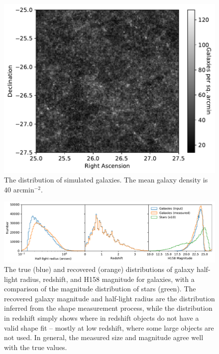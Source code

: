 \documentclass[aps,prd, amsmath,amssymb,superscriptaddress,showkeys,nofootinbib,reprint,preprintnumbers]{revtex4-1}
\begin{document}
\begin{figure}
\begin{center}
\includegraphics[width=\columnwidth]{figures/galaxies.pdf}
\end{center}
\caption[]{
The distribution of simulated galaxies. The mean galaxy density is 40 arcmin$^{-2}$. 
\label{fig:galaxies}}
\end{figure}

\begin{figure}
\begin{center}
\includegraphics[width=\textwidth]{figures/hist.pdf}
\end{center}
\caption[]{
The true (blue) and recovered (orange) distributions of galaxy half-light radius, redshift, and H158 magnitude for galaxies, with a comparison of the magnitude distribution of stars (green). The recovered galaxy magnitude and half-light radius are the distribution inferred from the shape measurement process, while the distribution in redshift simply shows where in redshift objects do not have a valid shape fit -- mostly at low redshift, where some large objects are not used. In general, the measured size and magnitude agree well with the true values.
\label{fig:hist}}
\end{figure}
\end{document}
